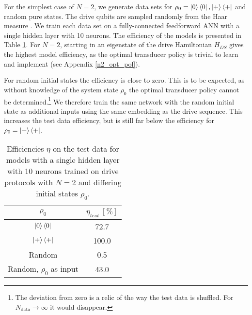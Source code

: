 For the simplest case of $N = 2$, we generate data sets for $\rho_0 = \ket{0} \bra{0}, \ket{+} \bra{+}$ and random pure states.
The drive qubits are sampled randomly from the Haar measure \cite{Mezzadri}.
We train each data set on a fully-connected feedforward ANN with a single hidden layer with 10 neurons.
The efficiency of the models is presented in Table \ref{n2efftable}.
For $N = 2$, starting in an eigenstate of the drive Hamiltonian $H_{DS}$ gives the highest model efficiency, as the optimal transducer policy is trivial to learn and implement (see Appendix \ref{n2_opt_pol}).

For random initial states the efficiency is close to zero.
This is to be expected, as without knowledge of the system state $\rho_0$ the optimal transducer policy cannot be determined.\footnote{The deviation from zero is a relic of the way the test data is shuffled. For $N_{\mathrm{data}} \to \infty$ it would disappear.}
We therefore train the same network with the random initial state as additional inputs using the same embedding as the drive sequence.
This increases the test data efficiency, but is still far below the efficiency for $\rho_0 = \ket{+} \bra{+}$.


\begin{table}[h]
	\centering
	\begin{tabular}{ c | c }
		$\rho_0$ & $\eta_{test} \ [\%]$ \\
		\hline
		$\ket{0} \bra{0}$ & 72.7 \\
		$\ket{+} \bra{+}$ & 100.0 \\
		Random & 0.5 \\
		Random, $\rho_0$ as input & 43.0 \\
	\end{tabular}
	\caption{Efficiencies $\eta$ on the test data for models with a single hidden layer with 10 neurons trained on drive protocols with $N = 2$ and differing initial states $\rho_0$.}
	\label{n2efftable}
\end{table}